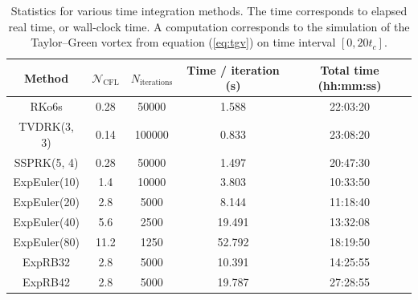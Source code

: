       \begin{table}
        \center
        \begin{tabular}{c|cccc}
          Method       & $\mathcal{N}_\textrm{CFL}$ & $N_\textrm{iterations}$ & Time / iteration (s) & Total time (hh:mm:ss) \\ \hline
          RKo6s        & 0.28                       &                   50000 &                1.588 &             22:03:20  \\
          TVDRK(3, 3)  & 0.14                       &                  100000 &                0.833 &             23:08:20  \\
          SSPRK(5, 4)  & 0.28                       &                   50000 &                1.497 &             20:47:30  \\ \hline
          ExpEuler(10) & 1.4                        &                   10000 &                3.803 &             10:33:50  \\
          ExpEuler(20) & 2.8                        &                    5000 &                8.144 &             11:18:40  \\
          ExpEuler(40) & 5.6                        &                    2500 &               19.491 &             13:32:08  \\
          ExpEuler(80) & 11.2                       &                    1250 &               52.792 &             18:19:50  \\
          ExpRB32      & 2.8                        &                    5000 &               10.391 &             14:25:55  \\
          ExpRB42      & 2.8                        &                    5000 &               19.787 &             27:28:55  \\
        \end{tabular}
        \caption{
          Statistics for various time integration methods.
          The time corresponds to elapsed real time, or wall-clock time.
          A computation corresponds to the simulation of the Taylor--Green vortex from equation (\ref{eq:tgv}) on time interval $\left[0, 20 t_c\right]$.}\label{tab:tgv}
      \end{table}

